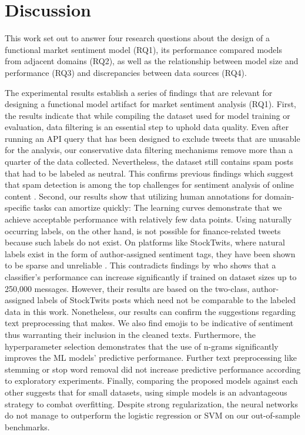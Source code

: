 \section{Discussion}

This work set out to answer four research questions about the design of a functional market sentiment model (RQ1), its performance compared models from adjacent domains (RQ2), as well as the relationship between model size and performance (RQ3) and discrepancies between data sources (RQ4).

The experimental results establish a series of findings that are relevant for designing a functional model artifact for market sentiment analysis (RQ1). First, the results indicate that while compiling the dataset used for model training or evaluation, data filtering is an essential step to uphold data quality. Even after running an API query that has been designed to exclude tweets that are unusable for the analysis, our conservative data filtering mechanisms remove more than a quarter of the data collected. Nevertheless, the dataset still contains spam posts that had to be labeled as neutral. This confirms previous findings which suggest that spam detection is among the top challenges for sentiment analysis of online content . Second, our results show that utilizing human annotations for domain-specific tasks can amortize quickly: The learning curves demonstrate that we achieve acceptable performance with relatively few data points. Using naturally occurring labels, on the other hand, is not possible for finance-related tweets because such labels do not exist. On platforms like StockTwits, where natural labels exist in the form of author-assigned sentiment tags, they have been shown to be sparse and unreliable . This contradicts findings by  who shows that a classifier's performance can increase significantly if trained on dataset sizes up to 250,000 messages. However, their results are based on the two-class, author-assigned labels of StockTwits posts which need not be comparable to the labeled data in this work. Nonetheless, our results can confirm the suggestions regarding text preprocessing that  makes. We also find emojis to be indicative of sentiment thus warranting their inclusion in the cleaned texts. Furthermore, the hyperparameter selection demonstrates that the use of n-grams significantly improves the ML models' predictive performance. Further text preprocessing like stemming or stop word removal did not increase predictive performance according to exploratory experiments. Finally, comparing the proposed models against each other suggests that for small datasets, using simple models is an advantageous strategy to combat overfitting. Despite strong regularization, the neural networks do not manage to outperform the logistic regression or SVM on our out-of-sample benchmarks.



